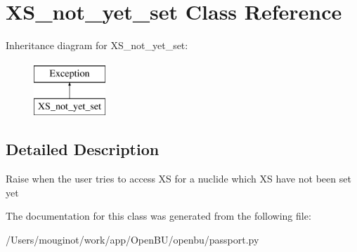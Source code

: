\hypertarget{classopenbu_1_1passport_1_1_x_s__not__yet__set}{}\section{X\+S\+\_\+not\+\_\+yet\+\_\+set Class Reference}
\label{classopenbu_1_1passport_1_1_x_s__not__yet__set}
Inheritance diagram for X\+S\+\_\+not\+\_\+yet\+\_\+set\+:\begin{figure}[H]
\begin{center}
\leavevmode
\includegraphics[height=2.000000cm]{classopenbu_1_1passport_1_1_x_s__not__yet__set}
\end{center}
\end{figure}


\subsection{Detailed Description}
\begin{DoxyVerb}Raise when the user tries to access XS for a nuclide which XS have not been set yet \end{DoxyVerb}
 

The documentation for this class was generated from the following file\+:\begin{DoxyCompactItemize}
\item 
/\+Users/mouginot/work/app/\+Open\+B\+U/openbu/passport.\+py\end{DoxyCompactItemize}
